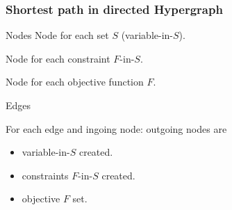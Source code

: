\documentclass{beamer}
\begin{document}

%
%

\begin{frame}
  \frametitle{Shortest path in directed Hypergraph}
  \vspace{-.2cm}
  \begin{block}{Nodes}
    Node for each set $S$ (variable-in-$S$).

    Node for each constraint $F$-in-$S$.

    Node for each objective function $F$.


  \end{block}
  \vspace{-.2cm}
  \begin{block}{Edges}

    For each edge and ingoing node: outgoing nodes are
    \begin{itemize}
        \item variable-in-$S$ created.
        \item constraints $F$-in-$S$ created.
        \item objective $F$ set.
    \end{itemize}
  \end{block}

\end{frame}
\end{document}
